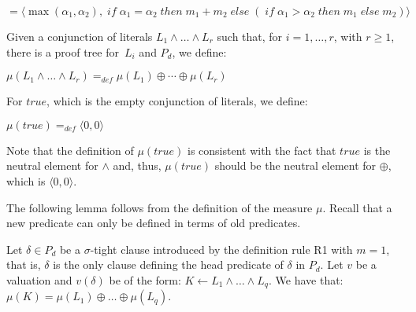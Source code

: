 \documentclass[english]{tlp}
\newcommand{\bif}{\;{\mathit{if}}\;}
\newcommand{\bth}{\;{\mathit{then}}\;}
\newcommand{\bel}{\;{\mathit{else}}\;}
\renewcommand{\mathit}{\displaystyle}
\begin{document}
$=\langle \max(\alpha _{1},\alpha _{2}), 
\bif \alpha_1\!=\!\alpha_2 \bth m_1\!+\!m_2 
\bel \!(\! \!\bif \alpha_1\!>\!\alpha_2 \bth m_1 \!\bel m_2)\rangle$

\smallskip{}


\noindent Given a conjunction of literals \( L_{1}\wedge \ldots
\wedge L_{r} \) such that, for $i=1,\ldots,r$, with $r\!\geq\! 1$, 
there is a proof tree
for~$L_i$ and $P_d$, we define:
\smallskip{}

\( \mu (L_{1}\wedge \ldots \wedge L_{r})=_{\mathit{def}} \mu (L_{1})\oplus \cdots
\oplus \mu (L_{r}) \)

\smallskip

\noindent For  $\mathit{true}$, which is the empty conjunction of literals, we define:
\smallskip

$\mu(\mathit{true})=_{\mathit{def}}\langle0,0\rangle$

\smallskip
\noindent
Note that the definition of  $\mu(\mathit{true})$ is consistent with
the fact that $\mathit{true}$ is 
the neutral element for $\wedge$ and, thus, 
$\mu(\mathit{true})$ should be the neutral element for $\oplus$, which 
is $\langle0,0\rangle$.
 


 The following lemma follows from the definition of the measure $\mu$. Recall that
a new predicate can only be defined in terms of old predicates.

\begin{lemma}
\label{lemma:mu-for-a-definition}
\noindent Let $\delta\in P_d$ be a $\sigma$-tight
clause introduced by the
definition rule {\rm{R1}} with $m\!=\!1$, that is, $\delta$
is the only clause defining the head predicate of $\delta$ in $P_d$.
Let $v$ be a valuation and  $v(\delta)$  be of the form\/{\rm{:}}
$K\leftarrow L_1\wedge \ldots \wedge L_q$.
We have that\/{\rm{:}} $\mu(K)=\mu(L_1)\oplus \ldots \oplus \mu(L_q)$.
\end{lemma}
\end{document}
